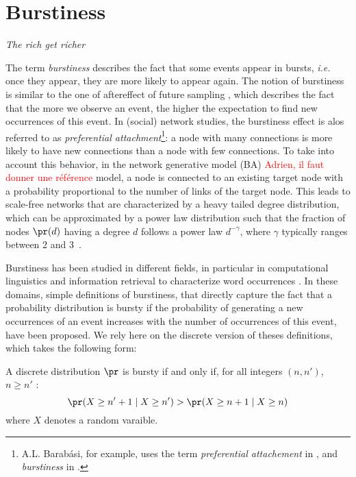\section{Burstiness}
\label{sec:burstiness}
\vspace{-0.2cm}
\begin{center} \emph{The rich get richer} \end{center}

\vspace{0.1cm}

The term \textit{burstiness} describes the fact that some events appear in bursts, \textit{i.e.} once they appear, they are more likely to appear again. The notion of burstiness is similar to the one of aftereffect of future sampling \cite{feller_68}, which describes the fact that the more we observe an event, the higher the expectation to find new occurrences of this event. In (social) network studies, the burstiness effect is alos referred to as \textit{preferential attachment}\footnote{A.L. Barab\'asi, for example, uses the term \textit{preferential attachement} in \cite{barabasi1999emergence}, and \textit{burstiness} in \cite{barabasi_burst}.}: a node with many connections is more likely to have new connections than a node with few connections. To take into account this behavior, in the network generative model  (BA) \textcolor{red}{Adrien, il faut donner une r\'ef\'erence} model, a node is connected to an existing target node with a probability proportional to the number of links of the target node. This leads to scale-free networks that are characterized by a heavy tailed degree distribution, which can be approximated by a power law distribution such that the fraction of nodes $\pr(d)$ having a degree $d$ follows a power law $d^{-\gamma}$, where $\gamma$ typically ranges between 2 and 3~\cite{barabasi1999emergence}. 

Burstiness has been studied in different fields, in particular in computational linguistics and information retrieval to characterize word occurrences \cite{church1995poisson}. In these domains, simple definitions of burstiness, that directly capture the fact that a probability distribution is bursty if the probability of generating a new occurrences of an event increases with the number of occurrences of this event, have been proposed\cite{clinchant2008bnb,clinchant2010information}. We rely here on the discrete version of theses definitions, which takes the following form:
%
\begin{definition}[Burstiness]
	A discrete distribution $\pr$ is bursty if and only if, for all integers $(n, n')$, $n \geq n'$ :
	\begin{equation}
	\pr(X \geq n'+1 \mid X \geq n') > \pr(X \geq n+1 \mid X \geq n) 
	\end{equation}
	where $X$ denotes a random varaible.
\end{definition}
%

